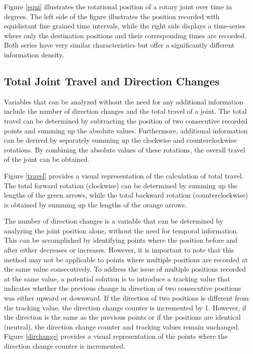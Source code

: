 \documentclass[conference]{IEEEtran}
\begin{document}
Figure \ref{equi} illustrates the rotational position of a rotary joint over time in degrees. The left side of the figure illustrates the position recorded with equidistant fine grained time intervals, while the right side displays a time-series where only the destination positions and their corresponding times are recorded. Both series have very similar characteristics but offer a significantly different information density.




\subsection{Total Joint Travel and Direction Changes}
Variables that can be analyzed without the need for any additional information include the number of direction changes and the total travel of a joint. The total travel can be determined by subtracting the position of two consecutive recorded points and summing up the absolute values. Furthermore, additional information can be derived by separately summing up the clockwise and counterclockwise rotations. By combining the absolute values of these rotations, the overall travel of the joint can be obtained.

Figure \ref{travel} provides a visual representation of the calculation of total travel. The total forward rotation (clockwise) can be determined by summing up the lengths of the green arrows, while the total backward rotation (counterclockwise) is obtained by summing up the lengths of the orange arrows.



The number of direction changes is a variable that can be determined by analyzing the joint position alone, without the need for temporal information. This can be accomplished by identifying points where the position before and after either decreases or increases. However, it is important to note that this method may not be applicable to points where multiple positions are recorded at the same value consecutively. To address the issue of multiple positions recorded at the same value, a potential solution is to introduce a tracking value that indicates whether the previous change in direction of two consecutive positions was either upward or downward. If the direction of two positions is different from the tracking value, the direction change counter is incremented by 1. However, if the direction is the same as the previous points or if the positions are identical (neutral), the direction change counter and tracking values remain unchanged. Figure \ref{dirchange} provides a visual representation of the points where the direction change counter is incremented.
\end{document}
